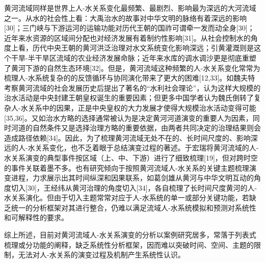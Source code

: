 黄河流域同样是世界上人-水关系变化最频繁、最剧烈、影响最为深远的大河流域之一。从水的社会性上看：大禹治水的故事对中华文明的脉络有着深远的影响[30]；三门峡与下游运河的运输功能对历代王朝的国祚可谓牵一发而动全身[30]；近年来水资源的区域间分配也对经济发展有着制约性影响[31]。从社会控制水的角度上看，历代中央王朝的黄河洪泛治理对水文系统变化影响深远；引黄灌溉则是这个干旱-半干旱区流域的农业经济发展命脉；近年来水库的调水调沙更是彻底重塑了黄河下游的自然生态环境[32]。但是，黄河流域这种频繁的人-水关系变化常常为梳理人-水系统复杂的的反馈循环与协同演化带来了更大的困难[12,33]。如魏夫特考察黄河流域的社会发展历史后提出了著名的“水利社会理论”，认为这样大规模的治水活动是中央封建王朝皇权诞生的重要因素；但更多中国学者认为魏氏倒转了复杂人-水关系中的因果，正是中央皇权的大力发展才使得大规模治水活动变得可能[35,36]。又如治水方略的选择通常被认为是决定黄河河道演变的重要人为因素，同时河道的自然条件又是选择治理方略的重要依据，由两者共同决定的治理结果则会造成路径依赖[34]。因此，为了梳理黄河流域无处不在的、长时间尺度的、影响深远的人-水关系变化，也不乏着眼于总结演变过程的著述。于宏瑞将黄河流域的人-水关系演变的典型事件按区域（上、中、下游）进行了细致梳理[19]，但对跨时空的事件关联着墨不多。也有研究倾向于按照黄河流域人-水关系的关键主题梳理演变进程，力求展示出其时间纵深和因果联系，如葛剑雄从黄河与中华文明互动的角度切入[30]，王经纬从黄河治理的角度切入[34]，各自梳理了长时间尺度黄河的人-水关系演化。但由于切入主题常常对应于人-水系统的单一或部分关键功能，若缺乏统一的分析框架对其进行整合，仍难以满足流域人-水系统模拟和预测对系统性和可解释性的要求。

综上所述，目前对黄河流域人-水关系演变的分析以案例研究居多，常落于列表式梳理或分功能的阐释，缺乏系统性分析框架，因而难以突破时间、空间、主题的限制，无法对人-水关系的演变过程及机制产生系统性认识。

